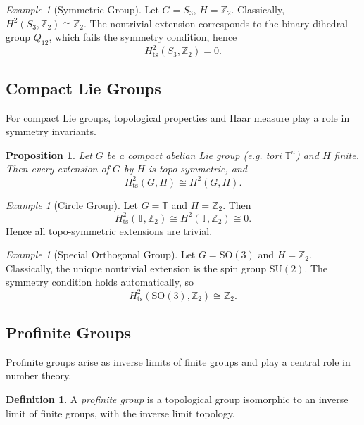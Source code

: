 \documentclass[11pt,a4paper]{article}
\theoremstyle{plain}
\newtheorem{proposition}[theorem]{Proposition}
\theoremstyle{definition}
\newtheorem{definition}[theorem]{Definition}
\theoremstyle{remark}
\newtheorem{example}[theorem]{Example}
\begin{document}
	\begin{example}[Symmetric Group]
		Let $G=S_3$, $H=\mathbb{Z}_2$.  
		Classically, $H^2(S_3,\mathbb{Z}_2) \cong \mathbb{Z}_2$.  
		The nontrivial extension corresponds to the binary dihedral group $Q_{12}$, which fails the symmetry condition, hence
		\[
		H^2_{\mathrm{ts}}(S_3,\mathbb{Z}_2) = 0.
		\]
	\end{example}
	
	\subsection{Compact Lie Groups}
	
	For compact Lie groups, topological properties and Haar measure play a role in symmetry invariants.  
	
	\begin{proposition}
		Let $G$ be a compact abelian Lie group (e.g. tori $\mathbb{T}^n$) and $H$ finite.  
		Then every extension of $G$ by $H$ is topo-symmetric, and
		\[
		H^2_{\mathrm{ts}}(G,H) \cong H^2(G,H).
		\]
	\end{proposition}
	
	\begin{example}[Circle Group]
		Let $G = \mathbb{T}$ and $H = \mathbb{Z}_2$.  
		Then
		\[
		H^2_{\mathrm{ts}}(\mathbb{T},\mathbb{Z}_2) \cong H^2(\mathbb{T},\mathbb{Z}_2) \cong 0.
		\]
		Hence all topo-symmetric extensions are trivial.  
	\end{example}
	
	\begin{example}[Special Orthogonal Group]
		Let $G = \mathrm{SO}(3)$ and $H = \mathbb{Z}_2$.  
		Classically, the unique nontrivial extension is the spin group $\mathrm{SU}(2)$.  
		The symmetry condition holds automatically, so
		\[
		H^2_{\mathrm{ts}}(\mathrm{SO}(3),\mathbb{Z}_2) \cong \mathbb{Z}_2.
		\]
	\end{example}
	
	\subsection{Profinite Groups}
	
	Profinite groups arise as inverse limits of finite groups and play a central role in number theory.  
	
	\begin{definition}
		A \emph{profinite group} is a topological group isomorphic to an inverse limit of finite groups, with the inverse limit topology.
	\end{definition}
	
\end{document}
